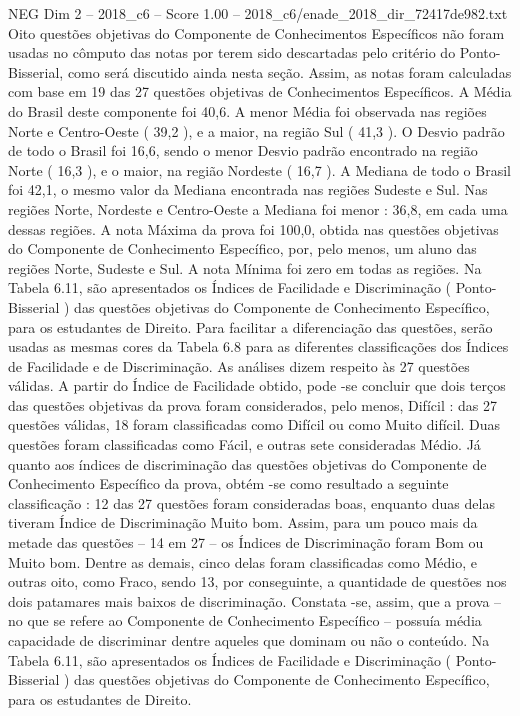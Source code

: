 \begin{textsample}{NEG Dim 2 – 2018\_c6 – Score 1.00 – 2018\_c6/enade\_2018\_dir\_72417de982.txt}
Oito questões objetivas do Componente de Conhecimentos Específicos não foram usadas no cômputo das notas por terem sido descartadas pelo critério do Ponto-Bisserial, como será discutido ainda nesta seção.
Assim, as notas foram calculadas com base em 19 das 27 questões objetivas de Conhecimentos Específicos.
A Média do Brasil deste componente foi 40,6.
A menor Média foi observada nas regiões Norte e Centro-Oeste ( 39,2 ), e a maior, na região Sul ( 41,3 ).
O Desvio padrão de todo o Brasil foi 16,6, sendo o menor Desvio padrão encontrado na região Norte ( 16,3 ), e o maior, na região Nordeste ( 16,7 ).
A Mediana de todo o Brasil foi 42,1, o mesmo valor da Mediana encontrada nas regiões Sudeste e Sul.
Nas regiões Norte, Nordeste e Centro-Oeste a Mediana foi menor : 36,8, em cada uma dessas regiões.
A nota Máxima da prova foi 100,0, obtida nas questões objetivas do Componente de Conhecimento Específico, por, pelo menos, um aluno das regiões Norte, Sudeste e Sul.
A nota Mínima foi zero em todas as regiões.
Na Tabela 6.11, são apresentados os Índices de Facilidade e Discriminação ( Ponto-Bisserial ) das questões objetivas do Componente de Conhecimento Específico, para os estudantes de Direito.
Para facilitar a diferenciação das questões, serão usadas as mesmas cores da Tabela 6.8 para as diferentes classificações dos Índices de Facilidade e de Discriminação.
As análises dizem respeito às 27 questões válidas.
A partir do Índice de Facilidade obtido, pode -se concluir que dois terços das questões objetivas da prova foram considerados, pelo menos, Difícil : das 27 questões válidas, 18 foram classificadas como Difícil ou como Muito difícil.
Duas questões foram classificadas como Fácil, e outras sete consideradas Médio.
Já quanto aos índices de discriminação das questões objetivas do Componente de Conhecimento Específico da prova, obtém -se como resultado a seguinte classificação : 12 das 27 questões foram consideradas boas, enquanto duas delas tiveram Índice de Discriminação Muito bom.
Assim, para um pouco mais da metade das questões – 14 em 27 – os Índices de Discriminação foram Bom ou Muito bom.
Dentre as demais, cinco delas foram classificadas como Médio, e outras oito, como Fraco, sendo 13, por conseguinte, a quantidade de questões nos dois patamares mais baixos de discriminação.
Constata -se, assim, que a prova – no que se refere ao Componente de Conhecimento Específico – possuía média capacidade de discriminar dentre aqueles que dominam ou não o conteúdo.
Na Tabela 6.11, são apresentados os Índices de Facilidade e Discriminação ( Ponto-Bisserial ) das questões objetivas do Componente de Conhecimento Específico, para os estudantes de Direito.

\end{textsample}
